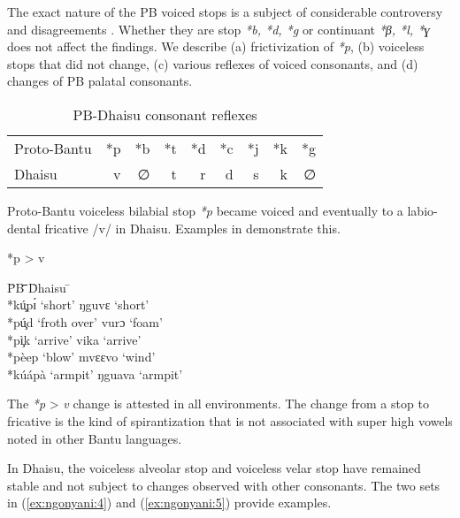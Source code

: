 \documentclass[output=paper,colorlinks,citecolor=brown]{langscibook}
\begin{document}
The exact nature of the PB voiced stops is a subject of considerable controversy and disagreements \citep{Hyman2019, Mould1972}. Whether they are stop \textit{*b, *d, *g} \citep{Guthrie1967, Meeussen1967, Meinhof1932}  or continuant \textit{*β, *l, *ɣ} \citep{Meinhof1932}  does not affect the findings. We describe (a) frictivization of \textit{*p}, (b) voiceless stops that did not change, (c) various reflexes of voiced consonants, and (d) changes of PB palatal consonants.

\begin{table}
    \caption{PB-Dhaisu consonant reflexes}
    \label{tab:ngonyani:18}
    \begin{tabular}{@{}l r r r r r r r r@{}}
         Proto-Bantu & *p & *b & *t & *d & *c & *j & *k & *g\\
         Dhaisu & v & ∅ & t & r & d & s & k & ∅ \\
    \end{tabular}
\end{table}

Proto-Bantu voiceless bilabial stop \textit{*p} became voiced and eventually to a labio-dental fricative /v/ in Dhaisu. Examples in  demonstrate this.

\ea%
	\label{ex:ngonyani:3}
	*p > v\\
    \begin{tabbing} 
        \= PB \quad\= \quad\= \quad\= \quad\= \quad\= \quad\= \quad\= \quad\= Dhaisu \quad\=  \quad\= \\
        \> *kú̧pɪ́ \> \>‘short’ \> \> \>  \> \> \> ŋguvɛ \> `short' \\
        \> *pú̧d \> \>‘froth over’ \>  \> \> \> \> \> vurɔ \> ‘foam’\\
        \> *pì̧k \> \>‘arrive’ \> \>  \> \> \> \> vika \> ‘arrive’\\
        \> *pèep \> \>‘blow’ \> \> \> \> \> \> mvɛɛvo \> ‘wind’\\
        \> *kúápà \> \>‘armpit’ \> \> \>  \> \> \> ŋguava \> ‘armpit’
    \end{tabbing}
\z

The  \textit{*p} > \textit{v}  change is attested in all environments. The change from a stop to fricative is the kind of spirantization that is not associated with super high vowels noted in other Bantu languages.

In Dhaisu, the voiceless alveolar stop and voiceless velar stop have remained stable and not subject to changes observed with other consonants. The two sets in (\ref{ex:ngonyani:4}) and (\ref{ex:ngonyani:5}) provide examples.
\end{document}
